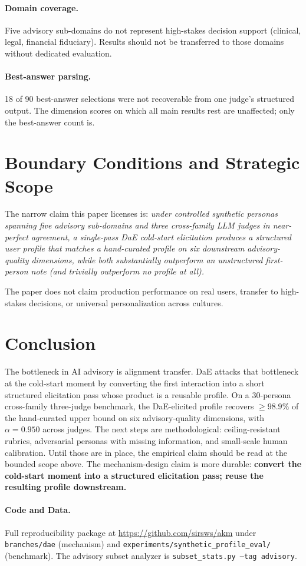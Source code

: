 \documentclass[11pt]{article}
\begin{document}
\paragraph{Domain coverage.} Five advisory sub-domains do not represent high-stakes decision support (clinical, legal, financial fiduciary). Results should not be transferred to those domains without dedicated evaluation.

\paragraph{Best-answer parsing.} 18 of 90 best-answer selections were not recoverable from one judge's structured output. The dimension scores on which all main results rest are unaffected; only the best-answer count is.

\section{Boundary Conditions and Strategic Scope}

The narrow claim this paper licenses is: \emph{under controlled synthetic personas spanning five advisory sub-domains and three cross-family LLM judges in near-perfect agreement, a single-pass DaE cold-start elicitation produces a structured user profile that matches a hand-curated profile on six downstream advisory-quality dimensions, while both substantially outperform an unstructured first-person note (and trivially outperform no profile at all).}

The paper does not claim production performance on real users, transfer to high-stakes decisions, or universal personalization across cultures.

\section{Conclusion}

The bottleneck in AI advisory is alignment transfer. DaE attacks that bottleneck at the cold-start moment by converting the first interaction into a short structured elicitation pass whose product is a reusable profile. On a 30-persona cross-family three-judge benchmark, the DaE-elicited profile recovers $\geq 98.9\%$ of the hand-curated upper bound on six advisory-quality dimensions, with $\alpha = 0.950$ across judges. The next steps are methodological: ceiling-resistant rubrics, adversarial personas with missing information, and small-scale human calibration. Until those are in place, the empirical claim should be read at the bounded scope above. The mechanism-design claim is more durable: \textbf{convert the cold-start moment into a structured elicitation pass; reuse the resulting profile downstream.}

\paragraph{Code and Data.} Full reproducibility package at \url{https://github.com/sirsws/akm} under \texttt{branches/dae} (mechanism) and \texttt{experiments/synthetic\_profile\_eval/} (benchmark). The advisory subset analyzer is \texttt{subset\_stats.py --tag advisory}.



\end{document}
